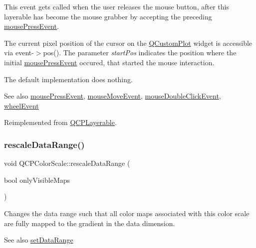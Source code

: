 This event gets called when the user releases the mouse button, after this layerable has become the mouse grabber by accepting the preceding \hyperlink{classQCPColorScale_a91f633b97ffcd57fdf8cd814974c20e6}{mouse\+Press\+Event}.

The current pixel position of the cursor on the \hyperlink{classQCustomPlot}{Q\+Custom\+Plot} widget is accessible via {\ttfamily event-\/$>$pos()}. The parameter {\itshape start\+Pos} indicates the position where the initial \hyperlink{classQCPColorScale_a91f633b97ffcd57fdf8cd814974c20e6}{mouse\+Press\+Event} occured, that started the mouse interaction.

The default implementation does nothing.

\begin{DoxySeeAlso}{See also}
\hyperlink{classQCPColorScale_a91f633b97ffcd57fdf8cd814974c20e6}{mouse\+Press\+Event}, \hyperlink{classQCPColorScale_a3b2bd79725aefaf2630fc76e90939442}{mouse\+Move\+Event}, \hyperlink{classQCPLayerable_a4171e2e823aca242dd0279f00ed2de81}{mouse\+Double\+Click\+Event}, \hyperlink{classQCPColorScale_a63cf19be184f6670c9495ad3a9a1baeb}{wheel\+Event} 
\end{DoxySeeAlso}


Reimplemented from \hyperlink{classQCPLayerable_aa0d79b005686f668622bbe66ac03ba2c}{Q\+C\+P\+Layerable}.

\mbox{\label{classQCPColorScale_a425983db4478543924ddbd04ea20a356}} 
\subsubsection{\texorpdfstring{rescale\+Data\+Range()}{rescaleDataRange()}}
{\footnotesize\ttfamily void Q\+C\+P\+Color\+Scale\+::rescale\+Data\+Range (\begin{DoxyParamCaption}\item[{bool}]{only\+Visible\+Maps }\end{DoxyParamCaption})}

Changes the data range such that all color maps associated with this color scale are fully mapped to the gradient in the data dimension.

\begin{DoxySeeAlso}{See also}
\hyperlink{classQCPColorScale_abe88633003a26d1e756aa74984587fef}{set\+Data\+Range} 
\end{DoxySeeAlso}
\mbox{\label{classQCPColorScale_ab9dcc0c1cd583477496209b1413bcb99}} 
